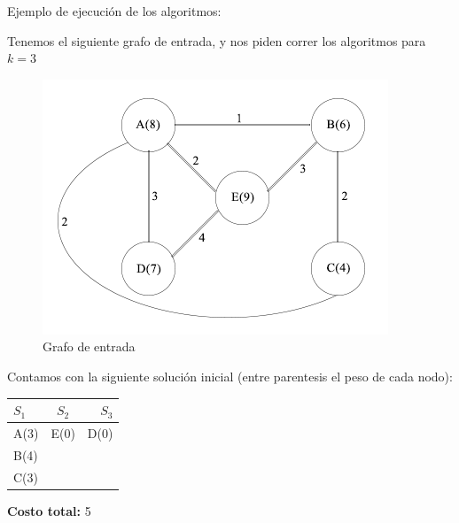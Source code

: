 Ejemplo de ejecución de los algoritmos:

Tenemos el siguiente grafo de entrada, y nos piden correr los algoritmos para $k=3$

\begin{figure}[H]
    \centering
    \includegraphics[scale=0.7]{ejercicio-4-ejemplo-entrada.png}
    \caption{Grafo de entrada}
    \label{fig:ej4_ejemplo}
\end{figure}

Contamos con la siguiente solución inicial (entre parentesis el peso de cada nodo):
\begin{center}
  \begin{tabular}{ l | c | r }
    $S_{1}$ & $S_{2}$ & $S_{3}$ \\ \hline
    A(3) & E(0) & D(0) \\
    B(4) &  &  \\
    C(3) &  &  \\
  \end{tabular}
  \textbf{Costo total:} 5
\end{center}



